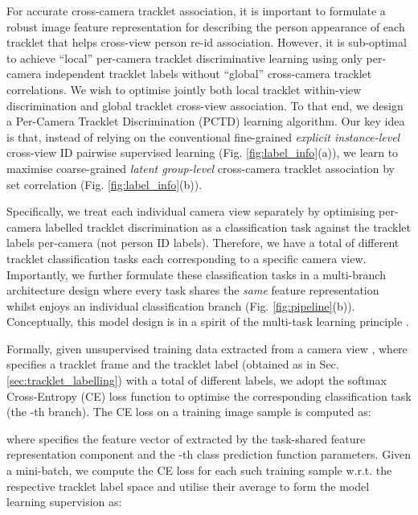 \documentclass[runningheads]{llncs}
\begin{document}
For accurate cross-camera tracklet association, 
it is important to formulate a robust image feature representation for
describing the person appearance of each tracklet
that helps cross-view 
person re-id association.
However, it is sub-optimal to achieve ``local'' per-camera tracklet
discriminative learning using only per-camera independent tracklet labels
without ``global'' cross-camera tracklet correlations. We wish to
optimise jointly both local tracklet within-view discrimination and global
tracklet cross-view association.
To that end, we design a Per-Camera Tracklet Discrimination (PCTD) learning algorithm.
Our key idea is that, instead of relying on 
the conventional fine-grained {\em explicit instance-level} cross-view
ID pairwise supervised learning
(Fig. \ref{fig:label_info}(a)),
we learn to maximise coarse-grained {\em latent group-level}
cross-camera tracklet association by set correlation
(Fig. \ref{fig:label_info}(b)).

Specifically, we treat each individual camera view separately
by optimising per-camera labelled tracklet discrimination as a
classification task against the tracklet labels per-camera 
(not person ID labels). 
Therefore, we have a total of  different tracklet classification tasks
each corresponding to a specific camera view.
Importantly, we further formulate these  classification tasks
in a multi-branch architecture design where 
every task shares the {\em same} feature representation 
whilst enjoys an individual classification branch (Fig. \ref{fig:pipeline}(b)).
Conceptually, this model design is in a spirit of the multi-task learning principle \cite{evgeniou2004regularized,ando2005framework}.

Formally, given unsupervised training data  
extracted from a camera view ,
where  specifies a tracklet frame and 
the tracklet label (obtained as in Sec. \ref{sec:tracklet_labelling})
with a total of  different labels,
we adopt the softmax Cross-Entropy (CE) loss function
to optimise the corresponding classification task (the -th branch).
The CE loss on a training image sample  is computed as: 

where  specifies the feature vector of 
extracted by the task-shared feature representation component 
and
 the -th class prediction function parameters. 
Given a mini-batch, 
we compute the CE loss for each such training sample
w.r.t. the respective tracklet label space
and utilise their average to form the model learning supervision as:
\end{document}
